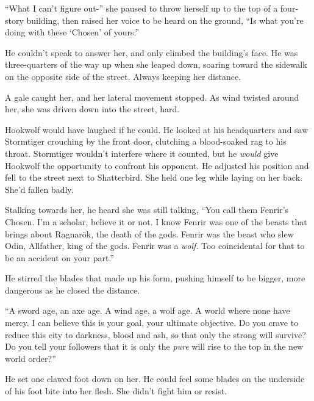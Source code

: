 ``What I can't figure out-'' she paused to throw herself up to the top of a four-story building, then raised her voice to be heard on the ground, ``Is what you're doing with these `Chosen' of yours.''



He couldn't speak to answer her, and only climbed the building's face.  He was three-quarters of the way up when she leaped down, soaring toward the sidewalk on the opposite side of the street.  Always keeping her distance.



A gale caught her, and her lateral movement stopped.  As wind twisted around her, she was driven down into the street, hard.



Hookwolf would have laughed if he could.  He looked at his headquarters and saw Stormtiger crouching by the front door, clutching a blood-soaked rag to his throat.  Stormtiger wouldn't interfere where it counted, but he \emph{would} give Hookwolf the opportunity to confront his opponent.  He adjusted his position and fell to the street next to Shatterbird.  She held one leg while laying on her back.  She'd fallen badly.



Stalking towards her, he heard she was still talking, ``You call them Fenrir's Chosen.  I'm a scholar, believe it or not.  I know Fenrir was one of the beasts that brings about Ragnar\"{o}k, the death of the gods.  Fenrir was the beast who slew Odin, Allfather, king of the gods.  Fenrir was a \emph{wolf}.  Too coincidental for that to be an accident on your part.''



He stirred the blades that made up his form, pushing himself to be bigger, more dangerous as he closed the distance.



``A sword age, an axe age.  A wind age, a wolf age.  A world where none have mercy.  I can believe this is your goal, your ultimate objective.  Do you crave to reduce this city to darkness, blood and ash, so that only the strong will survive?  Do you tell your followers that it is only the \emph{pure} will rise to the top in the new world order?''



He set one clawed foot down on her.  He could feel some blades on the underside of his foot bite into her flesh.  She didn't fight him or resist.



